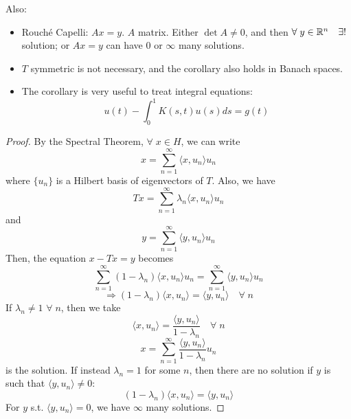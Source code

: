 \begin{remark}
    Also:
    \begin{itemize}
        \item Rouché Capelli: \(Ax = y\). \(A\) matrix. Either \(\det A \neq 0\), and then \(\forall\; y \in \mathbb{R}^n \quad \exists!\; \) solution; or \(Ax = y\) can have \(0\) or \(\infty \) many solutions.
        \item \(T\) symmetric is not necessary, and the corollary also holds in Banach spaces. 
        \item The corollary is very useful to treat integral equations:
        \[
            u(t) - \int_0^1 K(s, t) u(s) ds = g(t)
        \]
    \end{itemize}
\end{remark}
\begin{proof}
    By the Spectral Theorem, \(\forall \; x \in H\), we can write 
    \[
        x = \sum_{n=1}^\infty \langle x, u_n\rangle u_n
    \] 
    where \(\{u_n \}\) is a Hilbert basis of eigenvectors of \(T\). Also, we have 
    \[
        Tx = \sum_{n=1}^\infty \lambda_n \langle x, u_n\rangle u_n
    \]
    and 
    \[
        y = \sum_{n=1}^\infty \langle y, u_n\rangle u_n
    \]
    Then, the equation \(x - Tx = y\) becomes
    \[
        \sum_{n=1}^\infty (1- \lambda_n) \langle x, u_n\rangle u_n = \sum_{n=1}^\infty \langle y, u_n \rangle u_n
    \]
    \[
        \Rightarrow (1 - \lambda_n) \langle x, u_n\rangle = \langle y, u_n\rangle \quad \forall\; n
    \]
    If \(\lambda_n \neq 1\) \(\forall \; n\), then we take 
    \[
        \langle x, u_n\rangle = \frac{\langle y, u_n \rangle}{1 - \lambda_n} \quad \forall\; n
    \]
    \[
        x = \sum_{n=1}^\infty \frac{\langle y, u_n\rangle}{1 - \lambda_n} u_n
    \]
    is the solution. If instead \(\lambda_n = 1\) for some \(n\), then there are no solution if \(y\) is such that \(\langle y, u_n\rangle \neq 0\):
    \[
        (1 - \lambda_n) \langle x, u_n\rangle = \langle y, u_n\rangle
    \]
    For \(y\) s.t. \(\langle y, u_n\rangle = 0\), we have \(\infty\) many solutions.
\end{proof}